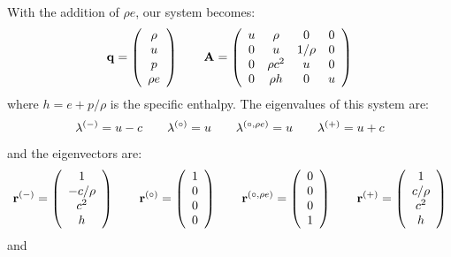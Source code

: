 With the addition of $\rho e$, our system becomes:
\begin{equation}
\qb = \left ( \begin{array}{c} \rho \\ u \\ p \\ \rho e \end{array} \right )
%
\qquad
%
\Ab = \left ( \begin{array}{cccc} u & \rho     & 0      & 0 \\
                                0 & u        & 1/\rho & 0 \\
                                0 & \rho c^2 & u      & 0 \\
                                0 & \rho h   & 0      & u
            \end{array} \right )
\end{equation}
where $h = e + p/\rho$ is the specific enthalpy.  The eigenvalues of this
system are:
\begin{equation}
\lambda^{(-)} = u - c \qquad
\lambda^{(\circ)} = u  \qquad
\lambda^{(\circ,\rho e)} = u  \qquad
\lambda^{(+)} = u + c
\end{equation}
and the eigenvectors are:
\begin{equation}
{\bf r}^{(-)} = \left ( \begin{array}{c} 1 \\ -c/\rho \\ c^2 \\ h \end{array} \right )
\qquad
{\bf r}^{(\circ)} = \left ( \begin{array}{c} 1 \\ 0 \\ 0 \\ 0 \end{array} \right )
\qquad
{\bf r}^{(\circ,\rho e)} = \left ( \begin{array}{c} 0 \\ 0 \\ 0 \\ 1 \end{array} \right )
\qquad
{\bf r}^{(+)} = \left ( \begin{array}{c} 1 \\ c/\rho \\ c^2 \\ h \end{array} \right )
\end{equation}
and
